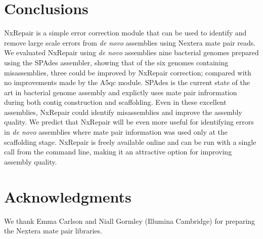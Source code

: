 \documentclass[fleqn,10pt]{wlpeerj}
\begin{document}
\section*{Conclusions}
NxRepair is a simple error correction module that can be used to identify and remove large scale errors from \textit{de novo} assemblies using Nextera mate pair reads. We evaluated NxRepair using \textit{de novo} assemblies nine bacterial genomes prepared using the SPAdes assembler, showing that of the six genomes containing misassemblies, three could be improved by NxRepair correction; compared with no improvements made by the A5qc module. SPAdes is the current state of the art in bacterial genome assembly and explictly uses mate pair infrormation during both contig construction and scaffolding. Even in these excellent assemblies, NxRepair could identify misassemblies and improve the assembly quality. We predict that NxRepair will be even more useful for identifying errors in \textit{de novo} assemblies where mate pair information was used only at the scaffolding stage. NxRepair is freely available online and can be run with a single call from the command line, making it an attractive option for improving assembly quality.

\section*{Acknowledgments}
We thank Emma Carlson and Niall Gormley (Illumina Cambridge) for preparing the Nextera mate pair libraries.




%
\end{document}
